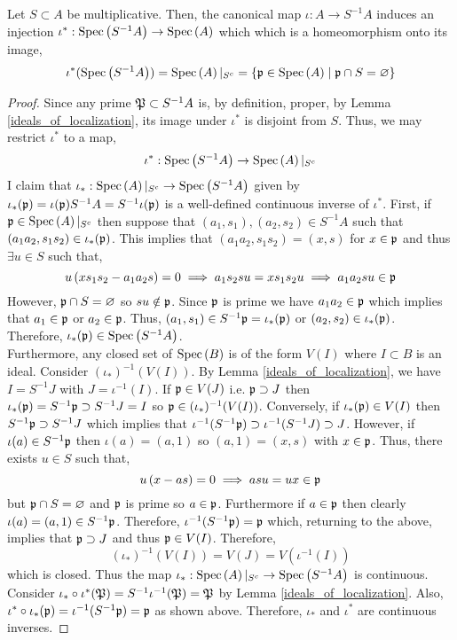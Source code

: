 \documentclass[12pt]{extarticle}
\begin{document}
\begin{lemma} \label{prime_ideals_of_localization}
Let $S \subset A$ be multiplicative. Then, the canonical map $\iota : A \to S^{-1}A$ induces an injection $\iota^* : \Spec{S^{-1}A} \to \Spec{A}$ which which is a homeomorphism onto its image,
\[ \iota^*(\Spec{S^{-1} A}) = \Spec{A} |_{S^{c}} = \{ \p \in \Spec{A} \mid \p \cap S = \varnothing \} \]
\end{lemma}

\begin{proof} 
Since any prime $\P \subset S^{-1} A$ is, by definition, proper, by Lemma \ref{ideals_of_localization}, its image under $\iota^*$ is disjoint from $S$. Thus, we may restrict $\iota^*$ to a map,
\[ \iota^* : \Spec{S^{-1} A} \to \Spec{A} |_{S^{c}} \]
I claim that $\iota_* : \Spec{A} |_{S^{c}} \to \Spec{S^{-1} A}$ given by $\iota_*(\p) = \iota(\p) S^{-1} A = S^{-1} \iota(\p)$ is a well-defined continuous inverse of $\iota^*$. First, if $\p \in \Spec{A} |_{S^{c}}$ then suppose that $(a_1, s_1), (a_2, s_2) \in S^{-1}A$ such that $(a_1 a_2, s_1 s_2) \in \iota_*(\p)$. This implies that $(a_1 a_2, s_1 s_2) = (x, s)$ for $x \in \p$ and thus $\exists u \in S$ such that,
\[ u \left( x s_1 s_2 - a_1 a_2 s \right) = 0 \implies a_1 s_2 su = x s_1 s_2 u \implies  a_1 a_2 su \in \p \]
However, $\p \cap S = \varnothing$ so $su \notin \p$. Since $\p$ is prime we have $a_1 a_2 \in \p$ which implies that $a_1 \in \p$ or $a_2 \in \p$. Thus, $(a_1, s_1) \in S^{-1} \p = \iota_*(\p)$ or $(a_2, s_2) \in \iota_*(\p)$. Therefore, $\iota_*(\p) \in \Spec{S^{-1} A}$. 
\bigskip\\
Furthermore, any closed set of $\Spec{B}$ is of the form $V(I)$ where $I \subset B$ is an ideal. Consider $(\iota_*)^{-1}(V(I))$. By Lemma \ref{ideals_of_localization}, we have $I = S^{-1} J$ with $J = \iota^{-1}(I)$. If $\p \in V(J)$ i.e. $\p \supset J$ then $\iota_*(\p) = S^{-1} \p \supset S^{-1} J = I$ so $\p \in (\iota_*)^{-1}(V(I))$. Conversely, if $\iota_*(\p) \in V(I)$ then $S^{-1} \p \supset S^{-1} J$ which implies that $\iota^{-1}(S^{-1} \p) \supset \iota^{-1}(S^{-1} J) \supset J$. However, if $\iota(a) \in S^{-1} \p$ then $\iota(a) = (a, 1)$ so $(a, 1) = (x, s)$ with $x \in \p$. Thus, there exists $u \in S$ such that,
\[ u \left( x - as \right) = 0 \implies asu = ux \in \p \]
but $\p \cap S = \varnothing$ and $\p$ is prime so $a \in \p$. Furthermore if $a \in \p$ then clearly $\iota(a) = (a, 1) \in S^{-1} \p$. Therefore, $\iota^{-1}(S^{-1} \p) = \p$ which, returning to the above, implies that $\p \supset J$ and thus $\p \in V(I)$. Therefore, 
\[ (\iota_*)^{-1}(V(I)) = V(J) = V(\iota^{-1}(I)) \]
which is closed. Thus the map $\iota_* : \Spec{A}|_{S^c} \to \Spec{S^{-1} A}$ is continuous. 
\bigskip\\
Consider $\iota_* \circ \iota^*(\P) = S^{-1} \iota^{-1}(\P) = \P$ by Lemma \ref{ideals_of_localization}. Also, $\iota^* \circ \iota_*(\p) = \iota^{-1}(S^{-1} \p) = \p$ as shown above. Therefore, $\iota_*$ and $\iota^*$ are continuous inverses.
\end{proof}
\end{document}
